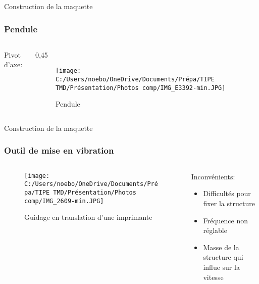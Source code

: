 \documentclass{beamer}
\begin{document}
	
	\begin{frame}{Construction de la maquette}
		\frametitle{Pendule}
		\begin{columns}
			Pivot d'axe:
			\begin{column}{0,45\textwidth}
				\begin{figure}
					\texttt{[image: C:/Users/noebo/OneDrive/Documents/Prépa/TIPE TMD/Présentation/Photos comp/IMG\_E3392-min.JPG]}
					\caption{Pendule}
				\end{figure}
			\end{column}
		\end{columns}
	\end{frame}

\begin{frame}{Construction de la maquette}
		\frametitle{Outil de mise en vibration}
		\begin{columns}
			\begin{column}{0.5\textwidth}
				\begin{figure}
					\texttt{[image: C:/Users/noebo/OneDrive/Documents/Prépa/TIPE TMD/Présentation/Photos comp/IMG\_2609-min.JPG]}
					\caption{Guidage en translation d'une imprimante}
				\end{figure}
			\end{column}
			\begin{column}{0.5\textwidth}
				Inconvénients:
				\begin{itemize}
					\item Difficultés pour fixer la structure
					\item Fréquence non réglable \\
					\item Masse de la structure qui influe sur la vitesse
				\end{itemize}

			\end{column}
		\end{columns}
	\end{frame}
\end{document}
